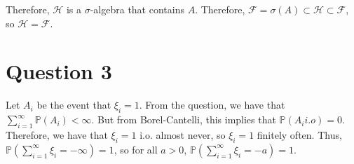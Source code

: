 \documentclass{article}
\theoremstyle{definition}
\numberwithin{theorem}{section}
\numberwithin{equation}{section}
\begin{document}
Therefore, $\mathcal{H}$ is a $\sigma$-algebra that contains $A$. Therefore, $\mathcal{F} = \sigma(A) \subset \mathcal{H} \subset \mathcal{F}$, so $\mathcal{H} = \mathcal{F}$.  
\section{Question 3}
Let $A_i$ be the event that $\xi_i= 1$. From the question, we have that $\sum_{i = 1}^{\infty}\mathbb{P}(A_i) < \infty$. But from Borel-Cantelli, this implies that $\mathbb{P}(A_i i.o) = 0$. Therefore, we have that $\xi_i = 1$ i.o. almost never, so $\xi_i = 1$ finitely often. Thus, $\mathbb{P}\left(\sum_{i = 1}^{\infty} \xi_i = - \infty \right) = 1$, so for all $a > 0$, $\mathbb{P}\left(\sum_{i = 1}^{\infty} \xi_i = - a \right) = 1$. 
\end{document}
